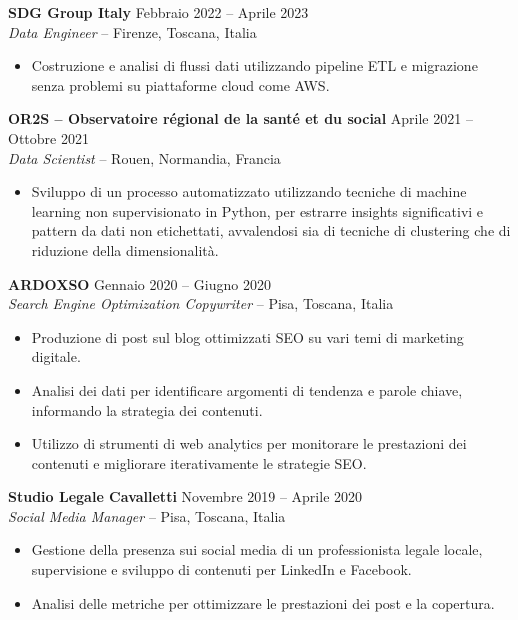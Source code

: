 \documentclass[11pt,a4paper]{article}
\begin{document}
\vspace{4pt}

\textbf{SDG Group Italy} \hfill Febbraio 2022 -- Aprile 2023\\
\textit{Data Engineer} -- Firenze, Toscana, Italia
\begin{itemize}[leftmargin=*, nosep]
    \item Costruzione e analisi di flussi dati utilizzando pipeline ETL e migrazione senza problemi su piattaforme cloud come AWS.
\end{itemize}

\vspace{4pt}

\textbf{OR2S -- Observatoire r\'{e}gional de la sant\'{e} et du social} \hfill Aprile 2021 -- Ottobre 2021\\
\textit{Data Scientist} -- Rouen, Normandia, Francia
\begin{itemize}[leftmargin=*, nosep]
    \item Sviluppo di un processo automatizzato utilizzando tecniche di machine learning non supervisionato in Python, per estrarre insights significativi e pattern da dati non etichettati, avvalendosi sia di tecniche di clustering che di riduzione della dimensionalit\`{a}.
\end{itemize}

\vspace{4pt}

\textbf{ARDOXSO} \hfill Gennaio 2020 -- Giugno 2020\\
\textit{Search Engine Optimization Copywriter} -- Pisa, Toscana, Italia
\begin{itemize}[leftmargin=*, nosep]
    \item Produzione di post sul blog ottimizzati SEO su vari temi di marketing digitale.
    \item Analisi dei dati per identificare argomenti di tendenza e parole chiave, informando la strategia dei contenuti.
    \item Utilizzo di strumenti di web analytics per monitorare le prestazioni dei contenuti e migliorare iterativamente le strategie SEO.
\end{itemize}

\vspace{4pt}

\textbf{Studio Legale Cavalletti} \hfill Novembre 2019 -- Aprile 2020\\
\textit{Social Media Manager} -- Pisa, Toscana, Italia
\begin{itemize}[leftmargin=*, nosep]
    \item Gestione della presenza sui social media di un professionista legale locale, supervisione e sviluppo di contenuti per LinkedIn e Facebook.
    \item Analisi delle metriche per ottimizzare le prestazioni dei post e la copertura.
\end{itemize}
\end{document}
